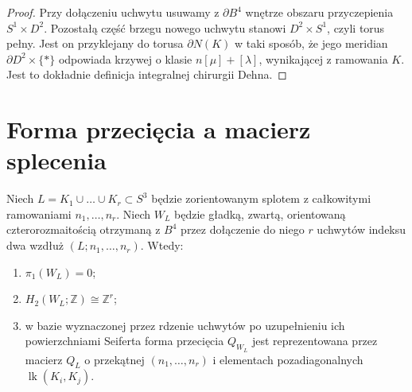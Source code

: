 \begin{proof}
Przy dołączeniu uchwytu usuwamy z $\partial B^4$
wnętrze obszaru przyczepienia $S^1\times D^2$.
Pozostałą część brzegu nowego uchwytu stanowi
$D^2\times S^1$, czyli torus pełny. Jest on przyklejany
do torusa $\partial N(K)$ w taki sposób, że jego
meridian $\partial D^2\times\{*\}$ odpowiada krzywej
o klasie $n[\mu]+[\lambda]$, wynikającej z ramowania
$K$. Jest to dokładnie definicja integralnej chirurgii
Dehna.
\end{proof}

\begin{center}
\end{center}

\section{Forma przecięcia a macierz splecenia}
\label{sec:kt-intersection}

\begin{twierdzenie}
Niech $L=K_1\cup\dots\cup K_r\subset S^3$ będzie
zorientowanym splotem z całkowitymi ramowaniami
$n_1,\dots,n_r$. Niech $W_L$ będzie gładką, zwartą,
orientowaną czterorozmaitością otrzymaną z $B^4$
przez dołączenie do niego $r$ uchwytów indeksu dwa
wzdłuż $(L;n_1,\dots,n_r)$. Wtedy:
\begin{enumerate}[label=(\roman*)]
\item $\pi_1(W_L)=0$;
\item $H_2(W_L;\mathbb Z)\cong\mathbb Z^r$;
\item w bazie wyznaczonej przez rdzenie uchwytów po
uzupełnieniu ich powierzchniami Seiferta forma przecięcia
$Q_{W_L}$ jest reprezentowana przez macierz
$Q_L$ o przekątnej $(n_1,\dots,n_r)$ i elementach
pozadiagonalnych $\operatorname{lk}(K_i,K_j)$.
\end{enumerate}
\end{twierdzenie}


